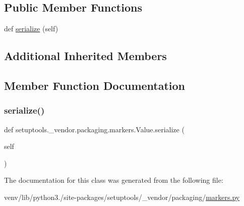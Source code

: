 \subsection*{Public Member Functions}
\begin{DoxyCompactItemize}
\item 
def \hyperlink{classsetuptools_1_1__vendor_1_1packaging_1_1markers_1_1Value_a54dd76bf0b8c979909d2bf6f677831c1}{serialize} (self)
\end{DoxyCompactItemize}
\subsection*{Additional Inherited Members}


\subsection{Member Function Documentation}
\mbox{\label{classsetuptools_1_1__vendor_1_1packaging_1_1markers_1_1Value_a54dd76bf0b8c979909d2bf6f677831c1}} 
\subsubsection{\texorpdfstring{serialize()}{serialize()}}
{\footnotesize\ttfamily def setuptools.\+\_\+vendor.\+packaging.\+markers.\+Value.\+serialize (\begin{DoxyParamCaption}\item[{}]{self }\end{DoxyParamCaption})}



The documentation for this class was generated from the following file\+:\begin{DoxyCompactItemize}
\item 
venv/lib/python3./site-\/packages/setuptools/\+\_\+vendor/packaging/\hyperlink{setuptools_2__vendor_2packaging_2markers_8py}{markers.\+py}\end{DoxyCompactItemize}
